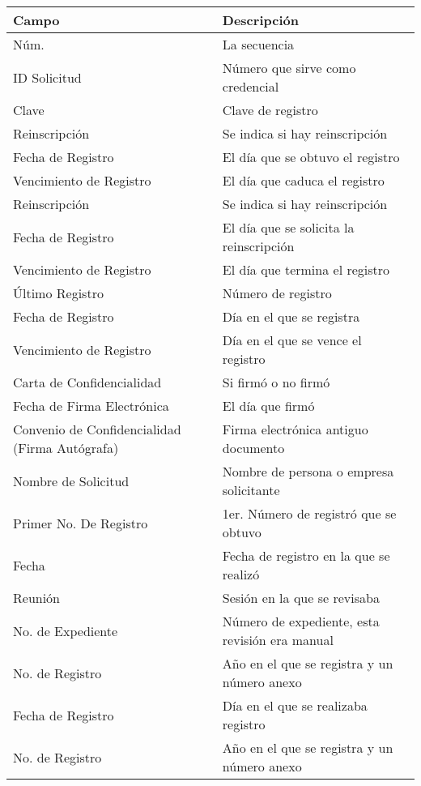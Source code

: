 \begin{tabular}{ m{} m{}  }%
	\rowcolor{gray1} {\bf Campo} &  {\bf Descripción} \\ \hline \hline

	\rowcolor{gray1} Núm. & La secuencia \\
	 ID Solicitud & Número que sirve como credencial\\
	\rowcolor{gray1} Clave & Clave de registro \\
	Reinscripción & Se indica si hay reinscripción\\
	\rowcolor{gray1} Fecha de Registro & El día que se obtuvo el registro \\
	Vencimiento de Registro & El día que caduca el registro\\
	\rowcolor{gray1} Reinscripción  &Se indica si hay reinscripción \\
	Fecha de Registro & El día que se solicita la reinscripción \\
	\rowcolor{gray1} Vencimiento de Registro & El día que termina el registro \\
	Último Registro & Número de registro\\
	\rowcolor{gray1}Fecha de Registro & Día en el que se registra \\
	Vencimiento de Registro& Día en el que se  vence el registro\\
	\rowcolor{gray1} Carta de Confidencialidad &  Si firmó o no firmó\\
	Fecha de Firma Electrónica & El día que firmó \\
	\rowcolor{gray1} Convenio de Confidencialidad (Firma Autógrafa) & Firma electrónica antiguo documento\\
	Nombre de Solicitud & Nombre de persona o empresa solicitante\\
	\rowcolor{gray1}Primer No. De Registro& 1er. Número de registró que se obtuvo \\
	Fecha	 & Fecha de registro en la que se realizó\\
	\rowcolor{gray1} Reunión & Sesión en la que se revisaba\\
	No. de Expediente &Número de expediente, esta revisión era manual  \\
	\rowcolor{gray1} No. de Registro  &Año en el  que se registra y un número anexo\\
	Fecha de Registro& Día en el que se realizaba registro \\
	\rowcolor{gray1} No. de Registro   & Año en el  que se registra y un número anexo\\

\end{tabular}
